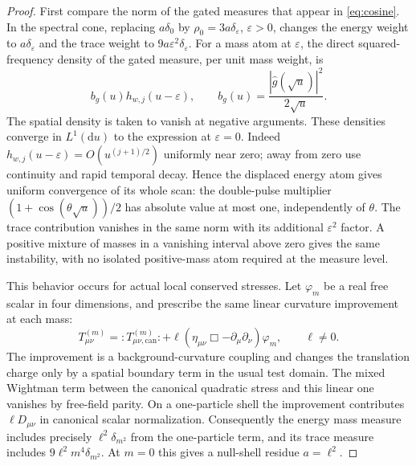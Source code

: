 \documentclass[11pt]{article}
\theoremstyle{remark}
\newcommand{\dd}{\mathrm d}
\newcommand{\eps}{\varepsilon}
\begin{document}
\begin{proof}
First compare the norm of the gated measures that appear in
\eqref{eq:cosine}. In the spectral cone, replacing
\(a\delta_0\) by \(\rho_0=3a\delta_\eps\), \(\eps>0\),
changes the energy weight to \(a\delta_\eps\)
and the trace weight to \(9a\eps^2\delta_\eps\).
For a mass atom at \(\eps\), the direct squared-frequency
density of the gated measure, per unit mass weight, is
\[
 b_g(u)h_{w,j}(u-\eps),\qquad
       b_g(u)=\frac{|\widehat g(\sqrt u)|^2}{2\sqrt u} .
\]
The spatial density is taken to vanish at negative arguments.
These densities converge in \(L^1(\dd u)\) to the expression
at \(\eps=0\). Indeed \(h_{w,j}(u-\eps)=O(u^{(j+1)/2})\)
uniformly near zero; away from zero use continuity and rapid
temporal decay. Hence the displaced energy atom gives uniform
convergence of its whole scan: the double-pulse multiplier
\((1+\cos(\theta\sqrt u))/2\) has absolute value at most one,
independently of \(\theta\). The trace contribution vanishes
in the same norm with its additional \(\eps^2\) factor. A
positive mixture of masses in a vanishing interval above zero
gives the same instability, with no isolated positive-mass
atom required at the measure level.

This behavior occurs for actual local conserved stresses.
Let \(\varphi_m\) be a real free scalar in four dimensions,
and prescribe the same linear curvature improvement at each
mass:
\[
 T_{\mu\nu}^{(m)}=:T_{\mu\nu,\mathrm{can}}^{(m)}:
  +\ell(\eta_{\mu\nu}\Box-\partial_\mu\partial_\nu)\varphi_m,
 \qquad \ell\ne0 .
\]
The improvement is a background-curvature coupling and changes
the translation charge only by a spatial boundary term in the
usual test domain. The mixed Wightman term between the canonical
quadratic stress and this linear one vanishes by free-field
parity. On a one-particle shell the improvement contributes
\(\ell D_{\mu\nu}\) in canonical scalar normalization.
Consequently the energy mass measure includes precisely
\(\ell^2\delta_{m^2}\) from the one-particle term, and its
trace measure includes \(9\ell^2m^4\delta_{m^2}\).
At \(m=0\) this gives a null-shell residue \(a=\ell^2\).


\end{proof}
\end{document}
